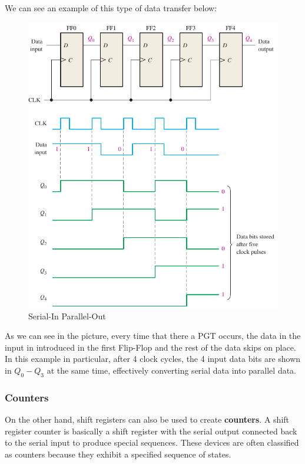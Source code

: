 \clearpage

We can see an example of this type of data transfer below:

\begin{figure}[H]
    \centering
    \includegraphics[]{Graphics/VHDL/Practice 5/SHIFT_REGISTER_BASICS/DATA_TRANSMISSION/SIPO_and_Wave.pdf}
    \caption{Serial-In Parallel-Out ~\autocite{FLOYD}}
    \label{fig:SIPO}
\end{figure}

As we can see in the picture, every time that there a PGT occurs, the data in the input in introduced in the first Flip-Flop and the rest of the data skips on place. In this example in particular, after 4 clock cycles, the 4 input data bits are shown in $Q_0 - Q_3$ at the same time, effectively converting serial data into parallel data.\medskip

\clearpage

\subsubsection{Counters}
\label{sec:COUNTERS}

On the other hand, shift registers can also be used to create \textbf{counters}. A shift register counter is basically a shift register with the serial output connected back to the serial input to produce special sequences. These devices are often classified as counters because they exhibit a specified sequence of states.\medskip 

